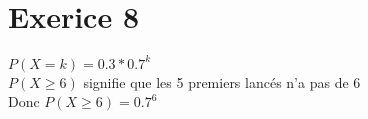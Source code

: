 \documentclass{article}
\author{Frederic Becerril}
\begin{document}
\part*{Exerice 8}

$P(X = k) = 0.3 * 0.7^k$\\
$P(X \geq 6)$ signifie que les 5 premiers lancés n'a pas de 6\\
Donc $P(X \geq 6) = 0.7^6$
\end{document}
